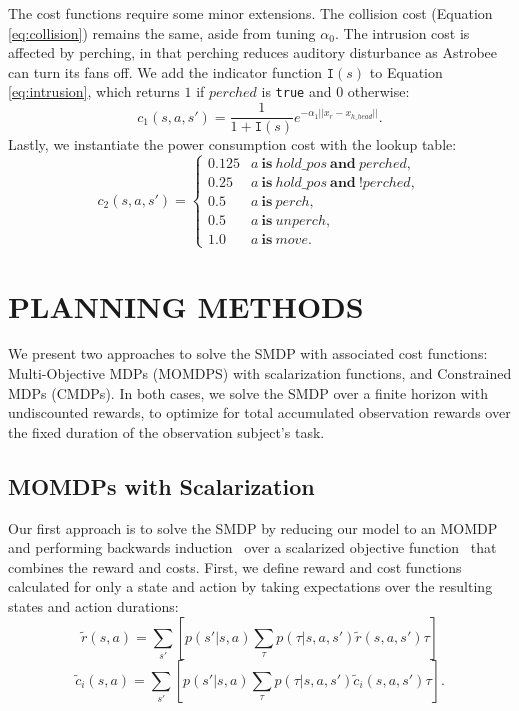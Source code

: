 \documentclass[letterpaper, 10 pt, conference]{ieeeconf}  %
\begin{document}
The cost functions require some minor extensions.  The collision cost (Equation \ref{eq:collision}) remains the same, aside from tuning $\alpha_0$.  The intrusion cost is affected by perching, in that perching reduces auditory disturbance as Astrobee can turn its fans off.  We add the indicator function $\mathtt{I}(s)$ to Equation \ref{eq:intrusion}, which returns $1$ if $perched$ is \texttt{true} and $0$ otherwise:
\begin{equation}
c_1(s,a,s') = \frac{1}{1+\mathtt{I}(s)}e^{-\alpha_1||x_r - x_{h\_head}||}.
\end{equation}
Lastly, we instantiate the power consumption cost with the lookup table:
\begin{equation}
c_2(s,a,s') = \begin{cases}
0.125 & a\: \mathbf{is}\: hold\_pos\: \mathbf{and}\: perched,\\
0.25 & a\: \mathbf{is}\: hold\_pos\: \mathbf{and}\: !perched,\\
0.5 & a\: \mathbf{is}\: perch,\\
0.5 & a\: \mathbf{is}\: unperch,\\
1.0 & a\: \mathbf{is}\: move.
\end{cases}
\end{equation}

\section{PLANNING METHODS}
\label{sec:methods}
We present two approaches to solve the SMDP with associated cost functions:  Multi-Objective MDPs (MOMDPS) with scalarization functions, and Constrained MDPs (CMDPs).  In both cases, we solve the SMDP over a finite horizon with undiscounted rewards, to optimize for total accumulated observation rewards over the fixed duration of the observation subject's task.

\subsection{MOMDPs with Scalarization}
Our first approach is to solve the SMDP by reducing our model to an MOMDP and performing backwards induction~\cite{hu2007markov} over a scalarized objective function~\cite{roijers2013survey} that combines the reward and costs.  First, we define reward and cost functions calculated for only a state and action by taking expectations over the resulting states and action durations:
\begin{equation}
\label{eq:r}
\tilde{r}(s,a) = \sum_{s'}{\left[p(s'|s,a)\sum_{\tau}{p(\tau|s,a,s')\tilde{r}(s,a,s')\tau}\right]}
\end{equation}
\begin{equation}
\label{eq:c}
\tilde{c}_i(s,a) = \sum_{s'}{\left[p(s'|s,a)\sum_{\tau}{p(\tau|s,a,s')\tilde{c}_i(s,a,s')\tau}\right]}.
\end{equation}
\end{document}
